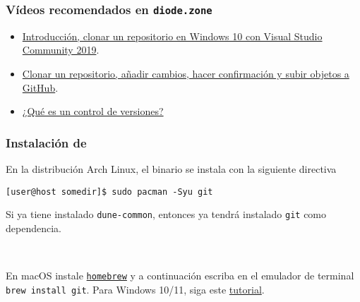 




\begin{frame}
	\frametitle{Vídeos recomendados en \texttt{diode.zone}~\diode{}}
	\begin{itemize}
		\item[\diode{}]
		
		\href{https://diode.zone/w/fd7db693-38be-46fd-871d-dfb545953231}{Introducción, clonar un repositorio en Windows 10 con Visual Studio Community 2019}.
		
		\item[\diode{}]
		
		\href{https://diode.zone/w/6c6997e0-73d9-4346-b9d3-6643edf5942a}{Clonar un repositorio, añadir cambios, hacer confirmación y subir objetos a GitHub}.
		
		\item[\diode{}]
		
		\href{https://diode.zone/w/7nbonxgvEr7FMTgkKrEu4N}{¿Qué es un control de versiones?}
	\end{itemize}
\end{frame}

\begin{frame}[fragile]
	\frametitle{Instalación de~\git{}}

	En la distribución Arch Linux, el binario se instala con la
	siguiente directiva

	\begin{verbatim}
[user@host somedir]$ sudo pacman -Syu git
    \end{verbatim}

	Si ya tiene instalado \lstinline|dune-common|, entonces ya tendrá
	instalado \lstinline|git| como dependencia.

	\

	En macOS instale \href{https://brew.sh}{\lstinline|homebrew|} y a
	continuación escriba en el emulador de terminal
	\lstinline|brew install git|.
	Para Windows 10/11, siga este
	\href{https://courses-2020-1.gitlab.io/abet-project/guideofuser.pdf}{\alert{tutorial}}.
\end{frame}

